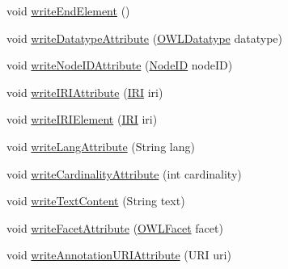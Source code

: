 \begin{DoxyCompactItemize}
void \hyperlink{classorg_1_1coode_1_1owlapi_1_1owlxml_1_1renderer_1_1_o_w_l_x_m_l_writer_a496a06a526c9387df3fb1e8cb4d56584}{write\-End\-Element} ()
\item 
void \hyperlink{classorg_1_1coode_1_1owlapi_1_1owlxml_1_1renderer_1_1_o_w_l_x_m_l_writer_ac6d6d2215520d62adf7685d22fd8d431}{write\-Datatype\-Attribute} (\hyperlink{interfaceorg_1_1semanticweb_1_1owlapi_1_1model_1_1_o_w_l_datatype}{O\-W\-L\-Datatype} datatype)
\item 
void \hyperlink{classorg_1_1coode_1_1owlapi_1_1owlxml_1_1renderer_1_1_o_w_l_x_m_l_writer_acdd6ef5398df880f0ce448a7795e7a24}{write\-Node\-I\-D\-Attribute} (\hyperlink{classorg_1_1semanticweb_1_1owlapi_1_1model_1_1_node_i_d}{Node\-I\-D} node\-I\-D)
\item 
void \hyperlink{classorg_1_1coode_1_1owlapi_1_1owlxml_1_1renderer_1_1_o_w_l_x_m_l_writer_a200a852526a3ffda010ffc1857264a41}{write\-I\-R\-I\-Attribute} (\hyperlink{classorg_1_1semanticweb_1_1owlapi_1_1model_1_1_i_r_i}{I\-R\-I} iri)
\item 
void \hyperlink{classorg_1_1coode_1_1owlapi_1_1owlxml_1_1renderer_1_1_o_w_l_x_m_l_writer_a6e67bdf6bdfc93aee451837d1d2181a1}{write\-I\-R\-I\-Element} (\hyperlink{classorg_1_1semanticweb_1_1owlapi_1_1model_1_1_i_r_i}{I\-R\-I} iri)
\item 
void \hyperlink{classorg_1_1coode_1_1owlapi_1_1owlxml_1_1renderer_1_1_o_w_l_x_m_l_writer_aa13e8230714732558e9fbec89f50f149}{write\-Lang\-Attribute} (String lang)
\item 
void \hyperlink{classorg_1_1coode_1_1owlapi_1_1owlxml_1_1renderer_1_1_o_w_l_x_m_l_writer_a99704958c6763c71d3c17ba7ba5f5077}{write\-Cardinality\-Attribute} (int cardinality)
\item 
void \hyperlink{classorg_1_1coode_1_1owlapi_1_1owlxml_1_1renderer_1_1_o_w_l_x_m_l_writer_a53ee37c4ef0eebfd68c8d021b4a95de2}{write\-Text\-Content} (String text)
\item 
void \hyperlink{classorg_1_1coode_1_1owlapi_1_1owlxml_1_1renderer_1_1_o_w_l_x_m_l_writer_aa862fa25d4218ade2cc2195d45d484a2}{write\-Facet\-Attribute} (\hyperlink{enumorg_1_1semanticweb_1_1owlapi_1_1vocab_1_1_o_w_l_facet}{O\-W\-L\-Facet} facet)
\item 
void \hyperlink{classorg_1_1coode_1_1owlapi_1_1owlxml_1_1renderer_1_1_o_w_l_x_m_l_writer_ae5341e1086dd98c75eac459f68400a10}{write\-Annotation\-U\-R\-I\-Attribute} (U\-R\-I uri)
\end{DoxyCompactItemize}

